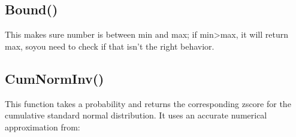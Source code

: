 \documentclass[letterpaper,10pt,english]{sphinxmanual}
\begin{document}
\ignorespaces 

\subsection{Bound()}
\label{\detokenize{reference/math:bound}}\label{\detokenize{reference/math:index-0}}
\sphinxAtStartPar
{}

\sphinxAtStartPar
{}

\sphinxAtStartPar
This makes sure
number is between min and max;
if min\textgreater{}max, it will return max, soyou need to check if that
isn’t the right behavior.

\sphinxAtStartPar
{}

\begin{sphinxVerbatim}[commandchars=\\\{\}]
\end{sphinxVerbatim}

\ignorespaces 

\subsection{CumNormInv()}
\label{\detokenize{reference/math:cumnorminv}}\label{\detokenize{reference/math:index-1}}
\sphinxAtStartPar
{}

\sphinxAtStartPar
{}

\sphinxAtStartPar
This function takes a probability and returns the    corresponding z\sphinxhyphen{}score for the cumulative standard normal distribution.   It uses an accurate numerical approximation from: 

\sphinxAtStartPar
{}

\begin{sphinxVerbatim}[commandchars=\\\{\}]
\end{sphinxVerbatim}

\sphinxAtStartPar
{}
\end{document}
